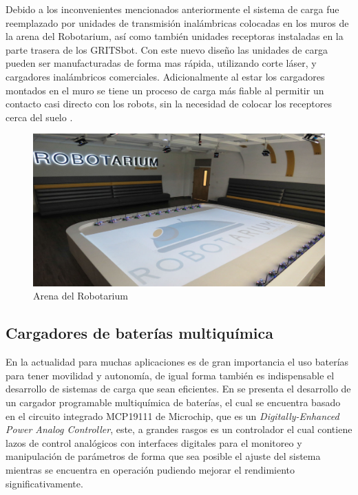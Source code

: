 Debido a los inconvenientes mencionados anteriormente el sistema de carga fue reemplazado por unidades de transmisión
inalámbricas colocadas en los muros de la arena del Robotarium, así como también unidades receptoras instaladas en la 
parte trasera de los GRITSbot. Con este nuevo diseño las unidades de carga pueden ser manufacturadas de forma
 mas rápida, utilizando corte láser, y cargadores inalámbricos comerciales. Adicionalmente al estar los cargadores
 montados en el muro se tiene un proceso de carga más fiable al permitir un contacto casi directo con los robots,
 sin la necesidad de colocar los receptores cerca del suelo \cite{wilson_robotarium_2021}. 

 \begin{figure}[H]
    \centering
    \includegraphics[scale=.4]{imagenes/Robotarium.png}
    \caption{Arena del  Robotarium  \cite{wilson_robotarium_2021}}
    \label{fig:robotarium}
\end{figure}

\subsection*{Cargadores de baterías multiquímica}
En la actualidad para muchas aplicaciones es de gran importancia el uso
baterías para tener movilidad y autonomía, de igual forma también es indispensable
el desarrollo de sistemas de carga que sean eficientes. En \cite{cleveland_developing_2015}
se presenta el desarrollo de un cargador programable multiquímica de baterías, el cual se 
encuentra basado en el circuito integrado MCP19111 de Microchip, que es un
\textit{Digitally-Enhanced Power Analog Controller}, este, a grandes rasgos es un controlador el cual
contiene lazos de control analógicos con interfaces digitales para el monitoreo y manipulación de parámetros
de forma que sea posible el ajuste del sistema mientras se encuentra en operación pudiendo mejorar el rendimiento
significativamente.  

